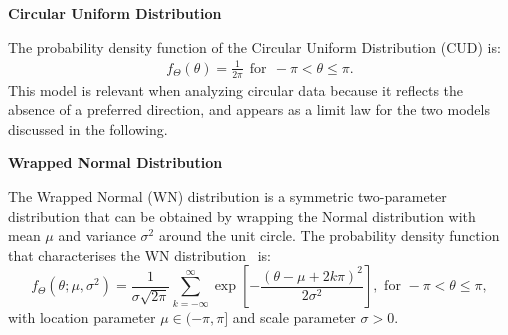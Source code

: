 \documentclass[remotesensing,article,submit,pdftex,moreauthors]{Definitions/mdpi}
\providecommand{\subsubsubsection}[1]{%
  \par\bigskip
  \noindent\textbf{#1}\par\nobreak\medskip
}
\begin{document}

\subsubsubsection{Circular Uniform Distribution}\label{sec:sec3.1.1_cap3}

The probability density function of the Circular Uniform Distribution (CUD) is:
\begin{eqnarray}\label{sec:sec3.1.1_cap3Eq1}
	f_{\Theta}(\theta)=\frac{1}{2\pi}~~\text{for}~~-\pi<\theta\leq\pi.
\end{eqnarray}
This model is relevant when analyzing circular data because it reflects the absence of a preferred direction, and appears as a limit law for the two models discussed in the following.

\subsubsubsection{Wrapped Normal Distribution}%

The Wrapped Normal (WN) distribution is a symmetric two-parameter distribution that can be obtained by wrapping the Normal distribution with mean $\mu$ and variance $\sigma^2$ around the unit circle. 
The probability density function that characterises the WN distribution~\cite{TopicsinCircularStatistics, CircularStatisticsinR, EfficientEvaluationoftheProbabilityDensityFunctionofaWrappedNormalDistribution} is:
\begin{equation}\label{sec:sec3.1.4_cap3Eq1}
	f_{\Theta}(\theta; \mu, \sigma^2) = \frac{1}{\sigma\sqrt{2\pi}}\sum_{k=-\infty}^{\infty}\exp\left[-\frac{(\theta-\mu+2k\pi)^2}{2\sigma^2}\right], \text{ for }-\pi < \theta \leq \pi,
\end{equation}
with location parameter $\mu \in (-\pi, \pi]$ and scale parameter $\sigma > 0$.
\end{document}
